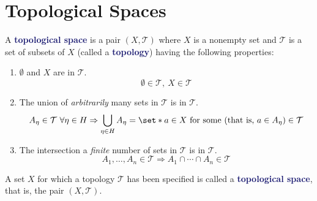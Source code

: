 \documentclass[11pt]{article}
\numberwithin{equation}{section}
\newcommand{\navy}[1]{\textcolor{MidnightBlue}{\bf #1}}
\theoremstyle{definition}
\theoremstyle{definition}
\def\Set{\set*}%
\def\imp{\Rightarrow}
\newcommand{\1}{\mathbbm 1}
\newcommand{\tT}{\mathcal T}
\begin{document}
\section{Topological Spaces}

\begin{definition}
	A \navy{topological space} is a pair $(X,\tT)$ where $X$ is a nonempty set and $\tT$ is a set of subsets of $X$ (called a \navy{topology}) having the following properties:
	\begin{enumerate}
		\item $\emptyset$ and $X$ are in $\tT$.
		\begin{equation}
			\emptyset \in \tT,\ X \in \tT
		\end{equation}
		\item The union of \textit{arbitrarily} many sets in $\tT$ is in $\tT$.
		\begin{equation}
			A_\eta \in \tT \ \forall \eta \in H \imp \bigcup_{\eta \in H} A_\eta = \Set{a \in X \text{ for some (that is, } a \in A_\eta \text{)}} \in \tT
		\end{equation}
		\item The intersection a \textit{finite} number of sets in $\tT$ is in $\tT$.
		\begin{equation}
			A_1, \ldots, A_n \in \tT \imp A_1 \cap \cdots \cap A_n \in \tT
		\end{equation}
	\end{enumerate}
	A set $X$ for which a topology $\tT$ has been specified is called a \navy{topological space}, that is, the pair $(X,\tT)$.
\end{definition}
\end{document}
